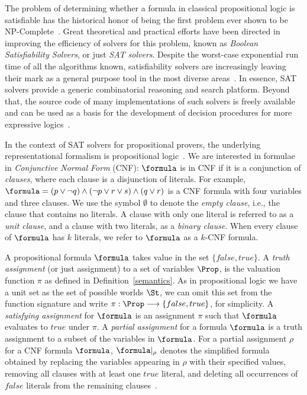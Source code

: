 The problem of determining whether a formula in classical propositional logic is
satisfiable has the historical honor of being the first problem ever shown to be
NP-Complete~\cite{Cook}. Great theoretical and practical efforts have been
directed in improving the efficiency of solvers for this problem, known as
\emph{Boolean Satisfiability Solvers}, or just \emph{SAT solvers}. Despite the
worst-case exponential run time of all the algorithms known, satisfiability
solvers are increasingly leaving their mark as a general purpose tool in the
most diverse areas~\cite{satchapter}. In essence, SAT solvers provide a generic
combinatorial reasoning and search platform. Beyond that, the source code
of many implementations of such solvers is freely available and can be
used as a basis for the development of decision procedures for more expressive
logics~\cite{giunchiglia2002sat}.

In the context of SAT solvers for propositional provers, the underlying
representational formalism is propositional logic~\cite{satchapter}. We are
interested in formulae in \emph{Conjunctive Normal Form} (CNF): $\formula$ is in
CNF if it is a conjunction of \emph{clauses}, where each clause is a disjunction
of literals. For example, $\formula = (p \lor \neg q) \land (\neg p \lor r \lor
s) \land (q \lor r)$ is a CNF formula with four variables and three clauses. 
We use the symbol $\emptyset$ to denote the \emph{empty clause}, i.e., the
clause that contains no literals. A clause with only one literal is referred to
as a \emph{unit clause}, and a clause with two literals, as a \emph{binary
clause}.  When every clause of $\formula$ has $k$ literals, we refer to
$\formula$ as a $k$-CNF formula.  

A propositional formula $\formula$ takes value in the set $\{false, true\}$. A
\emph{truth assignment} (or just assignment) to a set of variables $\Prop$, is
the valuation function $\pi$ as defined in Definition~\ref{semantics}. As in
propositional logic we have a unit set as the set of possible worlds $\St$, we
can omit this set from the function signature and write $\pi : \Prop \longrightarrow
\{false,true\}$, for simplicity. A \emph{satisfying assignment} for $\formula$
is an assignment $\pi$ such that $\formula$ evaluates to $true$ under $\pi$.  A
\emph{partial assignment} for a formula $\formula$ is a truth assignment to a
subset of the variables in $\formula$. For a partial assignment $\rho$ for a CNF
formula $\formula$, $\formula|_\rho$ denotes the simplified formula obtained by
replacing the variables appearing in $\rho$ with their specified values, removing
all clauses with at least one $true$ literal, and deleting all occurrences of
$false$ literals from the remaining clauses~\cite{satchapter}.

